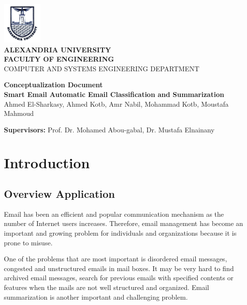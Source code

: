 \documentclass[a4paper,10pt]{article}
\begin{document}
\begin{titlepage}
\vspace{-1.5cm}
\begin{center}
\includegraphics[width=2cm]{Logo_Alexandria_University.jpg}\\
\vspace{1cm}
\textbf{\large ALEXANDRIA UNIVERSITY} \\
\textbf{FACULTY OF ENGINEERING} \\
{\small  COMPUTER AND SYSTEMS ENGINEERING DEPARTMENT}

\vspace{2.5cm}
\textbf{\LARGE Conceptualization Document}\\
\textbf{\small Smart Email Automatic Email Classification and Summarization}\\

\vspace{1cm}
{ Ahmed El-Sharkasy, Ahmed Kotb, Amr Nabil, Mohammad Kotb, Moustafa Mahmoud }
\end{center}

\vspace{1ex}
\textbf{Supervisors:} Prof. Dr. Mohamed Abou-gabal, Dr. Mustafa Elnainany
\end{titlepage}

\newpage
\tableofcontents
\newpage

\section{Introduction}

\subsection{Overview Application}
Email has been an efficient and popular communication mechanism as the number 
of Internet users increases. Therefore, email management has become an important 
and growing problem for individuals and organizations because it is prone to misuse.

One of the problems that are most important is disordered email messages, 
congested and unstructured emails in mail boxes. It may be very hard to 
find archived email messages, search for previous emails with specified contents 
or features when the mails are not well structured and organized. Email 
summarization is another important and challenging problem.
\end{document}
